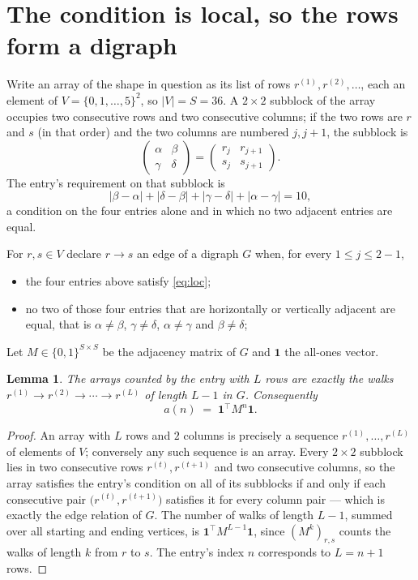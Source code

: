 \documentclass[11pt,a4paper]{article}
\theoremstyle{plain}
\newtheorem{lemma}[theorem]{Lemma}
\theoremstyle{definition}
\begin{document}
\section{The condition is local, so the rows form a digraph}

Write an array of the shape in question as its list of rows
$r^{(1)},r^{(2)},\dots$, each an element of
$V=\{0,1,\dots,5\}^{2}$, so $|V|=S=36$. A $2\times2$ subblock of the array
occupies two consecutive rows and two consecutive columns; if the two rows are $r$
and $s$ (in that order) and the two columns are numbered $j,j+1$,
the subblock is
\[
\begin{pmatrix}\alpha&\beta\\\gamma&\delta\end{pmatrix}=\begin{pmatrix}r_j&r_{j+1}\\s_j&s_{j+1}\end{pmatrix}.
\]
The entry's requirement on that subblock is
\begin{equation}\label{eq:loc}
|\beta-\alpha|+|\delta-\beta|+|\gamma-\delta|+|\alpha-\gamma|=10,
\end{equation}
a condition on the four entries alone and in which no two adjacent entries are equal.

For $r,s\in V$ declare $r\to s$ an edge of a digraph $G$ when, for every
$1\le j\le 2-1$,
\begin{itemize}
\item the four entries above satisfy \eqref{eq:loc};
\item no two of those four entries that are horizontally or vertically adjacent are equal, that is $\alpha\ne\beta$, $\gamma\ne\delta$, $\alpha\ne\gamma$ and $\beta\ne\delta$;
\end{itemize}
Let $M\in\{0,1\}^{S\times S}$ be the adjacency matrix of $G$ and $\mathbf{1}$ the
all-ones vector.

\begin{lemma}\label{lem:walk}
The arrays counted by the entry with $L$ rows are exactly the walks
$r^{(1)}\to r^{(2)}\to\cdots\to r^{(L)}$ of length $L-1$ in $G$. Consequently
\[
a(n)\;=\;\mathbf{1}^{\!\top}M^{n}\mathbf{1} .
\]
\end{lemma}

\begin{proof}
An array with $L$ rows and $2$ columns is precisely a sequence
$r^{(1)},\dots,r^{(L)}$ of elements of $V$; conversely any such sequence is an array.
Every $2\times2$ subblock lies in two consecutive rows $r^{(t)},r^{(t+1)}$ and two
consecutive columns, so the array satisfies the entry's condition on all of its subblocks
if and only if each consecutive pair $\bigl(r^{(t)},r^{(t+1)}\bigr)$ satisfies it for
every column pair --- which is exactly the edge relation of $G$. The number of walks of
length $L-1$, summed over all starting and ending vertices, is
$\mathbf{1}^{\!\top}M^{L-1}\mathbf{1}$, since $(M^{k})_{r,s}$ counts the walks of
length $k$ from $r$ to $s$. The entry's index $n$ corresponds to $L=n+1$ rows.
\end{proof}
\end{document}
